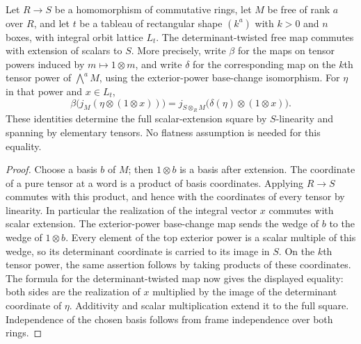 \begin{lemma}
\label{lem:determinant-free-base-change}
\leanok
Let $R\to S$ be a homomorphism of commutative rings, let $M$ be free
of rank $a$ over $R$, and let $t$ be a tableau of rectangular shape
$(k^a)$ with $k>0$ and $n$ boxes, with integral orbit lattice $L_t$.
The determinant-twisted free map commutes with
extension of scalars to $S$. More precisely, write $\beta$ for the maps
on tensor powers induced by $m\mapsto1\otimes m$, and write $\delta$
for the corresponding map on the $k$th tensor power of $\bigwedge^aM$,
using the exterior-power base-change isomorphism. For $\eta$ in that
power and $x\in L_t$,
\[
 \beta\bigl(j_M(\eta\otimes(1\otimes x))\bigr)
 =j_{S\otimes_R M}\bigl(\delta(\eta)\otimes(1\otimes x)\bigr).
\]
These identities determine the full scalar-extension square by
$S$-linearity and spanning by elementary tensors. No flatness assumption
is needed for this equality.
\end{lemma}
\begin{proof}
Choose a basis $b$ of $M$; then $1\otimes b$ is a basis after extension.
The coordinate of a pure tensor at a word is a product of basis
coordinates. Applying $R\to S$ commutes with this product, and hence
with the coordinates of every tensor by linearity. In particular the
realization of the integral vector $x$ commutes with scalar extension.
The exterior-power base-change map sends the wedge of $b$ to the wedge
of $1\otimes b$. Every element of the top exterior power is a scalar
multiple of this wedge, so its determinant coordinate is carried to
its image in $S$. On the $k$th tensor power, the same assertion follows
by taking products of these coordinates. The formula for the
determinant-twisted map now gives the displayed equality: both sides
are the realization of $x$ multiplied by the image of the determinant
coordinate of $\eta$. Additivity and scalar multiplication extend it
to the full square. Independence of the chosen basis follows from
frame independence over both rings.
\end{proof}

